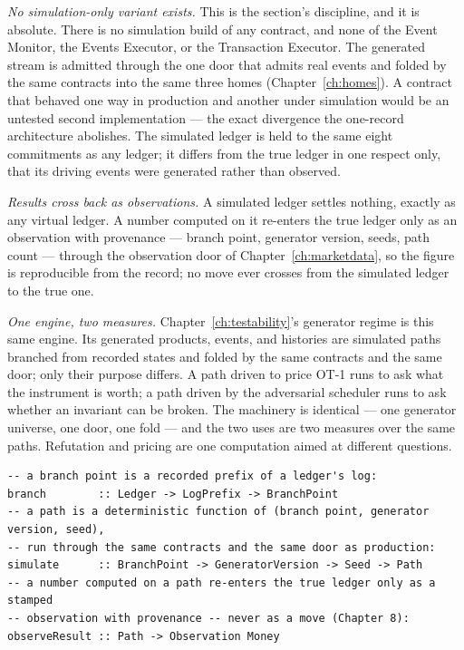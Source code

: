 \documentclass[11pt,a4paper]{article}
\begin{document}
\emph{No simulation-only variant exists.} This is the section's discipline, and it is
absolute. There is no simulation build of any contract, and none of the Event Monitor, the
Events Executor, or the Transaction Executor. The generated stream is admitted through the
one door that admits real events and folded by the same contracts into the same three homes
(Chapter~\ref{ch:homes}). A contract that behaved one way in production and another under
simulation would be an untested second implementation --- the exact divergence the
one-record architecture abolishes. The simulated ledger is held to the same eight
commitments as any ledger; it differs from the true ledger in one respect only, that its
driving events were generated rather than observed.

\emph{Results cross back as observations.} A simulated ledger settles nothing, exactly as
any virtual ledger. A number computed on it re-enters the true ledger only as an observation
with provenance --- branch point, generator version, seeds, path count --- through the
observation door of Chapter~\ref{ch:marketdata}, so the figure is reproducible from the
record; no move ever crosses from the simulated ledger to the true one.

\emph{One engine, two measures.} Chapter~\ref{ch:testability}'s generator regime is this same
engine. Its generated products, events, and histories are simulated paths branched from
recorded states and folded by the same contracts and the same door; only their purpose
differs. A path driven to price OT-1 runs to ask what the instrument is worth; a path driven
by the adversarial scheduler runs to ask whether an invariant can be broken. The machinery
is identical --- one generator universe, one door, one fold --- and the two uses are two
measures over the same paths. Refutation and pricing are one computation aimed at different
questions.

\begin{lstlisting}
-- a branch point is a recorded prefix of a ledger's log:
branch        :: Ledger -> LogPrefix -> BranchPoint
-- a path is a deterministic function of (branch point, generator version, seed),
-- run through the same contracts and the same door as production:
simulate      :: BranchPoint -> GeneratorVersion -> Seed -> Path
-- a number computed on a path re-enters the true ledger only as a stamped
-- observation with provenance -- never as a move (Chapter 8):
observeResult :: Path -> Observation Money
\end{lstlisting}
\end{document}

